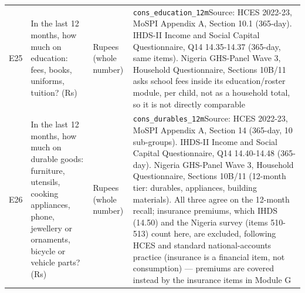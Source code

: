 \documentclass[10pt]{article}
\begin{document}
{\begin{longtable}{p{0.8cm}p{6.4cm}p{3.6cm}p{5.8cm}}
E25 & In the last 12 months, how much on education: fees, books, uniforms, tuition? (Rs) & Rupees (whole number) & \texttt{cons\_education\_12m}\newline Source: HCES 2022-23, MoSPI Appendix A, Section 10.1 (365-day). IHDS-II Income and Social Capital Questionnaire, Q14 14.35-14.37 (365-day, same items). Nigeria GHS-Panel Wave 3, Household Questionnaire, Sections 10B/11 asks school fees inside its education/roster module, per child, not as a household total, so it is not directly comparable \\
E26 & In the last 12 months, how much on durable goods: furniture, utensils, cooking appliances, phone, jewellery or ornaments, bicycle or vehicle parts? (Rs) & Rupees (whole number) & \texttt{cons\_durables\_12m}\newline Source: HCES 2022-23, MoSPI Appendix A, Section 14 (365-day, 10 sub-groups). IHDS-II Income and Social Capital Questionnaire, Q14 14.40-14.48 (365-day). Nigeria GHS-Panel Wave 3, Household Questionnaire, Sections 10B/11 (12-month tier: durables, appliances, building materials). All three agree on the 12-month recall; insurance premiums, which IHDS (14.50) and the Nigeria survey (items 510-513) count here, are excluded, following HCES and standard national-accounts practice (insurance is a financial item, not consumption) — premiums are covered instead by the insurance items in Module G \\
\bottomrule
\end{longtable}
}
\end{document}
